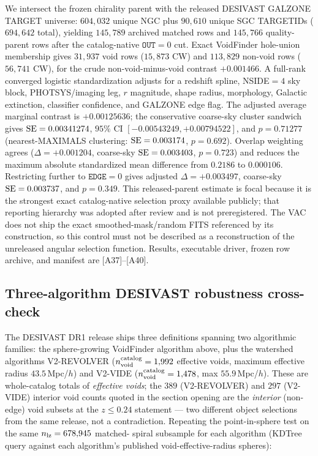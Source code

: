 \documentclass[aps,prd,twocolumn,superscriptaddress,showpacs,preprintnumbers,nofootinbib,longbibliography,floatfix]{revtex4-2}
\begin{document}
We
intersect the frozen chirality parent with the released DESIVAST GALZONE
TARGET universe: $604{,}032$ unique NGC plus $90{,}610$ unique SGC TARGETIDs
($694{,}642$ total), yielding $145{,}789$ archived matched rows and
$145{,}766$ quality-parent rows after the catalog-native $\mathtt{OUT}=0$ cut.
Exact VoidFinder hole-union membership gives $31{,}937$ void rows
($15{,}873$ CW) and $113{,}829$ non-void rows ($56{,}741$ CW), for the crude
non-void-minus-void contrast $+0.001466$. A full-rank converged logistic
standardization adjusts for a redshift spline, NSIDE$=4$ sky block,
PHOTSYS/imaging leg, $r$ magnitude, shape radius, morphology, Galactic
extinction, classifier confidence, and GALZONE edge flag. The adjusted
average marginal contrast is $+0.00125636$; the conservative coarse-sky
cluster sandwich gives ${\rm SE}=0.00341274$, $95\%$ CI
$[-0.00543249,+0.00794522]$, and $p=0.71277$ (nearest-MAXIMALS clustering:
${\rm SE}=0.003174$, $p=0.692$). Overlap weighting agrees
($\Delta=+0.001204$, coarse-sky ${\rm SE}=0.003403$, $p=0.723$) and reduces
the maximum absolute standardized mean difference from $0.2186$ to
$0.000106$. Restricting further to $\mathtt{EDGE}=0$ gives adjusted
$\Delta=+0.003497$, coarse-sky ${\rm SE}=0.003737$, and $p=0.349$.
This released-parent estimate is focal because it is the strongest exact
catalog-native selection proxy available publicly; that reporting hierarchy
was adopted after review and is not preregistered. The
VAC does not ship the exact
smoothed-mask/random FITS referenced by its construction, so this control
must not be described as a reconstruction of the unreleased angular
selection function. Results, executable driver, frozen row archive, and
manifest are [A37]--[A40].

\subsection{Three-algorithm DESIVAST robustness cross-check}\label{sec:desivast_three_algo}

The DESIVAST DR1 release ships three definitions spanning two algorithmic families: the
sphere-growing VoidFinder algorithm above, plus the watershed
algorithms V2-REVOLVER ($n_{\rm void}^{\rm catalog} = 1{,}992$ effective
voids, maximum effective radius $43.5\,$Mpc/$h$) and V2-VIDE
($n_{\rm void}^{\rm catalog} = 1{,}478$, max $55.9\,$Mpc/$h$). These are
whole-catalog totals of \emph{effective voids}; the $389$ (V2-REVOLVER)
and $297$ (V2-VIDE) interior void counts quoted in the section opening are the
\emph{interior} (non-edge) void subsets at the $z \le 0.24$ statement
— two different object selections from the same release, not a
contradiction. Repeating
the point-in-sphere test on the same $n_{\rm lz} = 678{,}945$ matched-
spiral subsample for each algorithm (KDTree query against each
algorithm's published void-effective-radius spheres):
\end{document}
